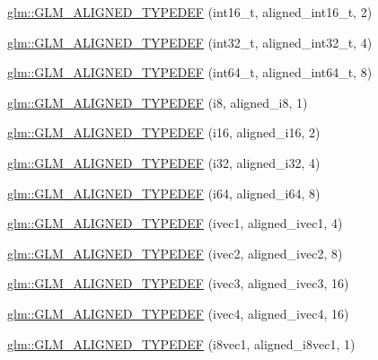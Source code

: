 \begin{DoxyCompactItemize}
\item 
\hyperlink{group__gtx__type__aligned_gafd2803d39049dd45a37a63931e25d943}{glm\-::\-G\-L\-M\-\_\-\-A\-L\-I\-G\-N\-E\-D\-\_\-\-T\-Y\-P\-E\-D\-E\-F} (int16\-\_\-t, aligned\-\_\-int16\-\_\-t, 2)
\item 
\hyperlink{group__gtx__type__aligned_gae553b33349d6da832cf0724f1e024094}{glm\-::\-G\-L\-M\-\_\-\-A\-L\-I\-G\-N\-E\-D\-\_\-\-T\-Y\-P\-E\-D\-E\-F} (int32\-\_\-t, aligned\-\_\-int32\-\_\-t, 4)
\item 
\hyperlink{group__gtx__type__aligned_ga16d223a2b3409e812e1d3bd87f0e9e5c}{glm\-::\-G\-L\-M\-\_\-\-A\-L\-I\-G\-N\-E\-D\-\_\-\-T\-Y\-P\-E\-D\-E\-F} (int64\-\_\-t, aligned\-\_\-int64\-\_\-t, 8)
\item 
\hyperlink{group__gtx__type__aligned_ga2de065d2ddfdb366bcd0febca79ae2ad}{glm\-::\-G\-L\-M\-\_\-\-A\-L\-I\-G\-N\-E\-D\-\_\-\-T\-Y\-P\-E\-D\-E\-F} (i8, aligned\-\_\-i8, 1)
\item 
\hyperlink{group__gtx__type__aligned_gabd786bdc20a11c8cb05c92c8212e28d3}{glm\-::\-G\-L\-M\-\_\-\-A\-L\-I\-G\-N\-E\-D\-\_\-\-T\-Y\-P\-E\-D\-E\-F} (i16, aligned\-\_\-i16, 2)
\item 
\hyperlink{group__gtx__type__aligned_gad4aefe56691cdb640c72f0d46d3fb532}{glm\-::\-G\-L\-M\-\_\-\-A\-L\-I\-G\-N\-E\-D\-\_\-\-T\-Y\-P\-E\-D\-E\-F} (i32, aligned\-\_\-i32, 4)
\item 
\hyperlink{group__gtx__type__aligned_ga8fe9745f7de24a8394518152ff9fccdc}{glm\-::\-G\-L\-M\-\_\-\-A\-L\-I\-G\-N\-E\-D\-\_\-\-T\-Y\-P\-E\-D\-E\-F} (i64, aligned\-\_\-i64, 8)
\item 
\hyperlink{group__gtx__type__aligned_gaaad735483450099f7f882d4e3a3569bd}{glm\-::\-G\-L\-M\-\_\-\-A\-L\-I\-G\-N\-E\-D\-\_\-\-T\-Y\-P\-E\-D\-E\-F} (ivec1, aligned\-\_\-ivec1, 4)
\item 
\hyperlink{group__gtx__type__aligned_gac7b6f823802edbd6edbaf70ea25bf068}{glm\-::\-G\-L\-M\-\_\-\-A\-L\-I\-G\-N\-E\-D\-\_\-\-T\-Y\-P\-E\-D\-E\-F} (ivec2, aligned\-\_\-ivec2, 8)
\item 
\hyperlink{group__gtx__type__aligned_ga3e235bcd2b8029613f25b8d40a2d3ef7}{glm\-::\-G\-L\-M\-\_\-\-A\-L\-I\-G\-N\-E\-D\-\_\-\-T\-Y\-P\-E\-D\-E\-F} (ivec3, aligned\-\_\-ivec3, 16)
\item 
\hyperlink{group__gtx__type__aligned_ga50d8a9523968c77f8325b4c9bfbff41e}{glm\-::\-G\-L\-M\-\_\-\-A\-L\-I\-G\-N\-E\-D\-\_\-\-T\-Y\-P\-E\-D\-E\-F} (ivec4, aligned\-\_\-ivec4, 16)
\item 
\hyperlink{group__gtx__type__aligned_ga9ec20fdfb729c702032da9378c79679f}{glm\-::\-G\-L\-M\-\_\-\-A\-L\-I\-G\-N\-E\-D\-\_\-\-T\-Y\-P\-E\-D\-E\-F} (i8vec1, aligned\-\_\-i8vec1, 1)

\end{DoxyCompactItemize}

